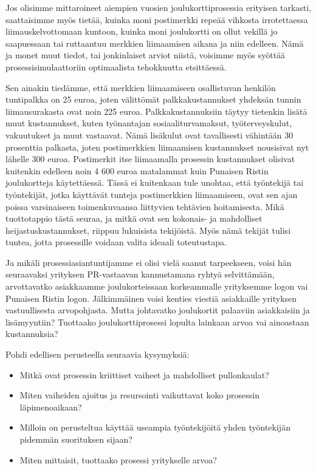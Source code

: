 \documentclass[
  finnish,
  letterpaper,
  DIV=11,
  numbers=noendperiod,
  oneside]{scrreprt}
\providecommand{\tightlist}{%
  \setlength{\itemsep}{0pt}\setlength{\parskip}{0pt}}
\begin{document}
Jos olisimme mittaroineet aiempien vuosien joulukorttiprosessia
erityisen tarkasti, saattaisimme myös tietää, kuinka moni postimerkki
repeää vihkosta irrotettaessa liimauskelvottomaan kuntoon, kuinka moni
joulukortti on ollut vekillä jo saapuessaan tai ruttaantuu merkkien
liimaamisen aikana ja niin edelleen. Nämä ja monet muut tiedot, tai
jonkinlaiset arviot niistä, voisimme myös syöttää prosessisimulaattoriin
optimaalista tehokkuutta etsittäessä.

Sen ainakin tiedämme, että merkkien liimaamiseen osallistuvan henkilön
tuntipalkka on 25 euroa, joten välittömät palkkakustannukset yhdeksän
tunnin liimausurakasta ovat noin 225 euroa. Palkkakustannuksiin täytyy
tietenkin lisätä muut kustannukset, kuten työnantajan
sosiaaliturvamaksut, työterveyskulut, vakuutukset ja muut vastaavat.
Nämä lisäkulut ovat tavallisesti vähintään 30 prosenttia palkasta, joten
postimerkkien liimaamisen kustannukset nousisivat nyt lähelle 300 euroa.
Postimerkit itse liimaamalla prosessin kustannukset olisivat kuitenkin
edelleen noin 4 600 euroa matalammat kuin Punaisen Ristin joulukortteja
käytettäessä. Tässä ei kuitenkaan tule unohtaa, että työntekijä tai
työntekijät, jotka käyttävät tunteja postimerkkien liimaamiseen, ovat
sen ajan poissa varsinaiseen toimenkuvaansa liittyvien tehtävien
hoitamisesta. Mikä tuottotappio tästä seuraa, ja mitkä ovat sen
kokonais- ja mahdolliset heijastuskustannukset, riippuu lukuisista
tekijöistä. Myös nämä tekijät tulisi tuntea, jotta prosessille voidaan
valita ideaali toteutustapa.

Ja mikäli prosessiasiantuntijamme ei olisi vielä saanut tarpeekseen,
voisi hän seuraavaksi yrityksen PR-vastaavan kannustamana ryhtyä
selvittämään, arvottavatko asiakkaamme joulukorteissaan korkeammalle
yrityksemme logon vai Punaisen Ristin logon. Jälkimmäinen voisi kenties
viestiä asiakkaille yrityksen vastuullisesta arvopohjasta. Mutta
johtavatko joulukortit palaaviin asiakkaisiin ja lisämyyntiin? Tuottaako
joulukorttiprosessi lopulta lainkaan arvoa vai ainoastaan kustannuksia?

Pohdi edellisen perusteella seuraavia kysymyksiä:

\begin{itemize}
\tightlist
\item
  Mitkä ovat prosessin kriittiset vaiheet ja mahdolliset pullonkaulat?
\item
  Miten vaiheiden ajoitus ja resursointi vaikuttavat koko prosessin
  läpimenoaikaan?
\item
  Milloin on perusteltua käyttää useampia työntekijöitä yhden
  työntekijän pidemmän suorituksen sijaan?
\item
  Miten mittaisit, tuottaako prosessi yritykselle arvoa?
\end{itemize}
\end{document}
